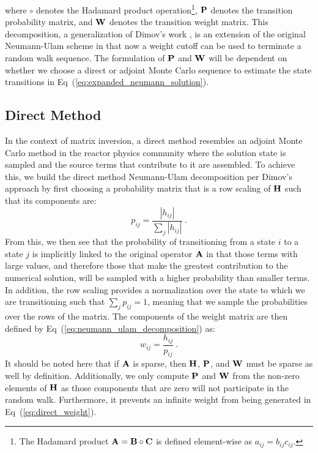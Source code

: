 where $\circ$ denotes the Hadamard product operation\footnote{The
  Hadamard product $\mathbf{A} = \mathbf{B} \circ \mathbf{C}$ is defined
  element-wise as $a_{ij} = b_{ij} c_{ij}$.}, $\mathbf{P}$ denotes the
transition probability matrix, and $\mathbf{W}$ denotes the transition
weight matrix. This decomposition, a generalization of Dimov's work
\citep{dimov_new_1998}, is an extension of the original Neumann-Ulam
scheme in that now a weight cutoff can be used to terminate a random
walk sequence. The formulation of $\mathbf{P}$ and $\mathbf{W}$ will be
dependent on whether we choose a direct or adjoint Monte Carlo
sequence to estimate the state transitions in
Eq~(\ref{eq:expanded_neumann_solution}).

\subsection{Direct Method}
\label{subsec:direct_mc}
In the context of matrix inversion, a direct method resembles an
adjoint Monte Carlo method in the reactor physics community where the
solution state is sampled and the source terms that contribute to it
are assembled. To achieve this, we build the direct method
Neumann-Ulam decomposition per Dimov's approach by first choosing a
probability matrix that is a row scaling of $\mathbf{H}$ such that its
components are:
\begin{equation}
  p_{ij} = \frac{|h_{ij}|}{\sum_j |h_{ij}|}\:.
  \label{eq:direct_probability}
\end{equation}
From this, we then see that the probability of transitioning from a
state $i$ to a state $j$ is implicitly linked to the original operator
$\mathbf{A}$ in that those terms with large values, and therefore those
that make the greatest contribution to the numerical solution, will be
sampled with a higher probability than smaller terms. In addition, the
row scaling provides a normalization over the state to which we are
transitioning such that $\sum_j p_{ij} = 1$, meaning that we sample
the probabilities over the rows of the matrix. The components of
the weight matrix are then defined by
Eq~(\ref{eq:neumann_ulam_decomposition}) as:
\begin{equation}
  w_{ij} = \frac{h_{ij}}{p_{ij}}\:.
  \label{eq:direct_weight}
\end{equation}
It should be noted here that if $\mathbf{A}$ is sparse, then $\mathbf{H}$,
$\mathbf{P}$, and $\mathbf{W}$ must be sparse as well by
definition. Additionally, we only compute $\mathbf{P}$ and $\mathbf{W}$ from
the non-zero elements of $\mathbf{H}$ as those components that are zero
will not participate in the random walk. Furthermore, it prevents an
infinite weight from being generated in Eq~(\ref{eq:direct_weight}).

